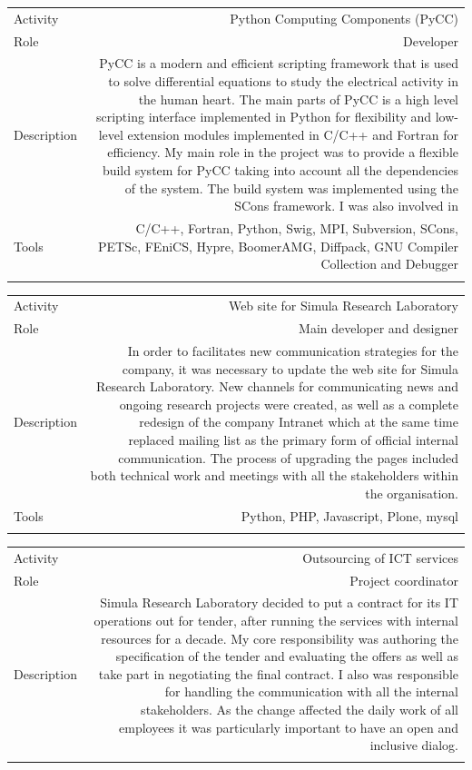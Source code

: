 \documentclass[english,a4paper,11pt]{article}
\begin{document}
\begin{tabular}{@{}LR}
Activity & Python Computing Components (PyCC) \\
Role & Developer \\
Description & PyCC is a modern and efficient scripting framework that is used
to solve differential equations to study the electrical activity in the human
heart. The main parts of PyCC is a high level scripting interface implemented in
Python for flexibility and low-level extension modules implemented in C/C++ and
Fortran for efficiency. My main role in the project was to provide a flexible
build system for PyCC taking into account all the dependencies of the system.
The build system was implemented using the SCons framework. I was also involved
in \\
Tools & C/C++, Fortran, Python, Swig, MPI, Subversion, SCons, PETSc, FEniCS,
Hypre, BoomerAMG, Diffpack, GNU Compiler Collection and Debugger \\
\addlinespace \bottomrule[.1pt] \addlinespace
\end{tabular}

\begin{tabular}{@{}LR}
Activity & Web site for Simula Research Laboratory \\
Role & Main developer and designer \\
Description & In order to facilitates new communication strategies for the
company, it was necessary to update the web site for Simula Research Laboratory.
New channels for communicating news and ongoing research projects were created,
as well as a complete redesign of the company Intranet which at the same time
replaced mailing list as the primary form of official internal communication.
The process of upgrading the pages included both technical work and
meetings with all the stakeholders within the organisation.
\\
Tools & Python, PHP, Javascript, Plone, mysql \\
\addlinespace \bottomrule[.1pt] \addlinespace
\end{tabular}

\begin{tabular}{@{}LR}
Activity & Outsourcing of ICT services \\
Role & Project coordinator \\
Description & Simula Research Laboratory decided to put a contract for
its IT operations out for tender, after running the services with internal
resources for a decade. My core responsibility was authoring the specification
of the tender and evaluating the offers as well as take part in negotiating the
final contract. I also was responsible for handling the communication with all
the internal stakeholders. As the change affected the daily work of all
employees it was particularly important to have an open and inclusive dialog. \\
\addlinespace \bottomrule[.1pt] \addlinespace
\end{tabular}
\end{document}
